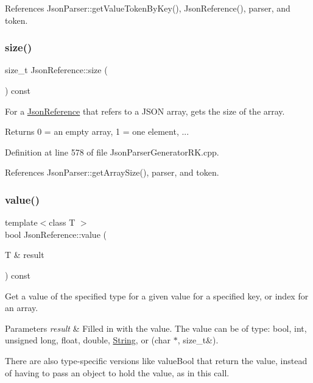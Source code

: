References Json\+Parser\+::get\+Value\+Token\+By\+Key(), Json\+Reference(), parser, and token.

\mbox{\label{class_json_reference_a9a196b64764b2943c425cee334f0b999}} 
\subsubsection{\texorpdfstring{size()}{size()}}
{\footnotesize\ttfamily size\+\_\+t Json\+Reference\+::size (\begin{DoxyParamCaption}{ }\end{DoxyParamCaption}) const}



For a \hyperlink{class_json_reference}{Json\+Reference} that refers to a J\+S\+ON array, gets the size of the array. 

\begin{DoxyReturn}{Returns}
0 = an empty array, 1 = one element, ... 
\end{DoxyReturn}


Definition at line 578 of file Json\+Parser\+Generator\+R\+K.\+cpp.



References Json\+Parser\+::get\+Array\+Size(), parser, and token.

\mbox{\label{class_json_reference_a9eb0bbb4ed98e7ebceeb41c757e0f15b}} 
\subsubsection{\texorpdfstring{value()}{value()}}
{\footnotesize\ttfamily template$<$class T $>$ \\
bool Json\+Reference\+::value (\begin{DoxyParamCaption}\item[{T \&}]{result }\end{DoxyParamCaption}) const\hspace{0.3cm}{\ttfamily [inline]}}



Get a value of the specified type for a given value for a specified key, or index for an array. 


\begin{DoxyParams}{Parameters}
{\em result} & Filled in with the value. The value can be of type\+: bool, int, unsigned long, float, double, \hyperlink{class_string}{String}, or (char $\ast$, size\+\_\+t\&).\\
\hline
\end{DoxyParams}
There are also type-\/specific versions like value\+Bool that return the value, instead of having to pass an object to hold the value, as in this call. 

